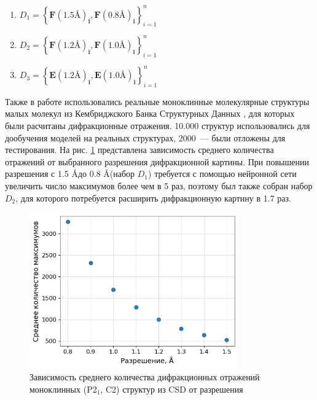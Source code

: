 \begin{enumerate}
\item $D_1 = \left\lbrace\mathbf{F(1.5\text{\AA})_{i}, F(0.8\text{\AA})_{i}}\right\rbrace^n_{i=1}$

\item $D_2 = \left\lbrace\mathbf{F(1.2\text{\AA})_{i}, F(1.0\text{\AA})_{i}}\right\rbrace^n_{i=1}$

\item $D_3 = \left\lbrace\mathbf{E(1.2\text{\AA})_{i}, E(1.0\text{\AA})_{i}}\right\rbrace^n_{i=1}$

\end{enumerate}

Также в работе использовались реальные моноклинные молекулярные структуры малых молекул из Кембриджского Банка Структурных Данных \cite{groom_cambridge_2014}, для которых были расчитаны дифракционные отражения. 10.000 структур использовались для дообучения моделей на реальных структурах, 2000~--- были отложены для тестирования. На рис. \ref{max_qty} представлена зависимость среднего количества отражений от выбранного разрешения дифракционной картины. При повышении разрешения с 1.5 \AA  до  0.8 \AA (набор $D_1$) требуется с помощью нейронной сети увеличить число максимумов более чем в 5 раз, поэтому был также собран набор $D_2$, для которого потребуется расширить дифракционную картину в 1.7 раз. 



\begin{figure}[H]
			\centering
            \includegraphics[width=0.8\textwidth]{figures/max_qty.png}
            \caption{Зависимость среднего количества дифракционных отражений моноклинных (P2$_1$, C2) структур из CSD от разрешения}
            \label{max_qty}
\end{figure}


